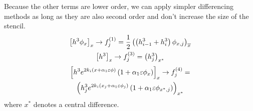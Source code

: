 \begin{frame} 
    Because the other terms are lower order, we can apply simpler differencing methods
    as long as they are also second order and don't increase the size of the stencil.
    \begin{gather*}  
        \left[ h^3\phi_x \right]_x \rightarrow f_j^{\left( 1 \right)} = \frac{1}{2}\left( \left( h_{i-1}^3 + h_i^3 \right) \phi_{x, j} \right)_{\overline{x}}\\
        \left[ h^3 \right]_x \rightarrow f_j^{\left( 3 \right)} = \left( h^3_j \right)_{x^*}\\
    \end{gather*}
    \vspace{-4em}
    \begin{multline*}
        \left[ h^3 e^{2k_i \left( x + \alpha_1 \varepsilon \phi \right)} \left( 1 + \alpha_1 \varepsilon \phi_x \right) \right]_x 
        \rightarrow f_j^{\left( 4 \right)} = \\ \left( h^3_j e^{2k_i \left( x_j + \alpha_1 \varepsilon \phi_j \right)} \left( 1 + \alpha_1 \varepsilon \phi_{x^*, j} \right) \right)_{x^*}
    \end{multline*}
    where $x^*$ denotes a central difference. 
\end{frame}